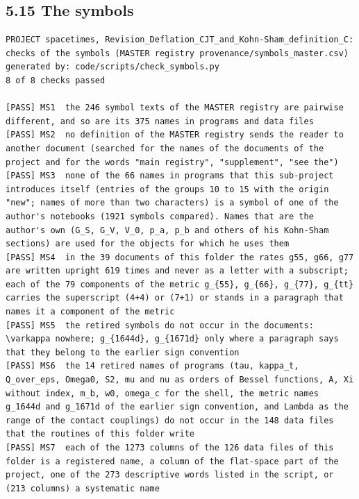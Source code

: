 \documentclass[
  10pt,
]{article}
\begin{document}
\hypertarget{the-symbols}{%
\subsection{5.15 The symbols}\label{the-symbols}}

\begin{verbatim}
PROJECT spacetimes, Revision_Deflation_CJT_and_Kohn-Sham_definition_C: checks of the symbols (MASTER registry provenance/symbols_master.csv)
generated by: code/scripts/check_symbols.py
8 of 8 checks passed

[PASS] MS1  the 246 symbol texts of the MASTER registry are pairwise different, and so are its 375 names in programs and data files
[PASS] MS2  no definition of the MASTER registry sends the reader to another document (searched for the names of the documents of the project and for the words "main registry", "supplement", "see the")
[PASS] MS3  none of the 66 names in programs that this sub-project introduces itself (entries of the groups 10 to 15 with the origin "new"; names of more than two characters) is a symbol of one of the author's notebooks (1921 symbols compared). Names that are the author's own (G_S, G_V, V_0, p_a, p_b and others of his Kohn-Sham sections) are used for the objects for which he uses them
[PASS] MS4  in the 39 documents of this folder the rates g55, g66, g77 are written upright 619 times and never as a letter with a subscript; each of the 79 components of the metric g_{55}, g_{66}, g_{77}, g_{tt} carries the superscript (4+4) or (7+1) or stands in a paragraph that names it a component of the metric
[PASS] MS5  the retired symbols do not occur in the documents: \varkappa nowhere; g_{1644d}, g_{1671d} only where a paragraph says that they belong to the earlier sign convention
[PASS] MS6  the 14 retired names of programs (tau, kappa_t, Q_over_eps, Omega0, S2, mu and nu as orders of Bessel functions, A, Xi without index, m_b, w0, omega_c for the shell, the metric names g_1644d and g_1671d of the earlier sign convention, and Lambda as the range of the contact couplings) do not occur in the 148 data files that the routines of this folder write
[PASS] MS7  each of the 1273 columns of the 126 data files of this folder is a registered name, a column of the flat-space part of the project, one of the 273 descriptive words listed in the script, or (213 columns) a systematic name

\end{verbatim}
\end{document}
